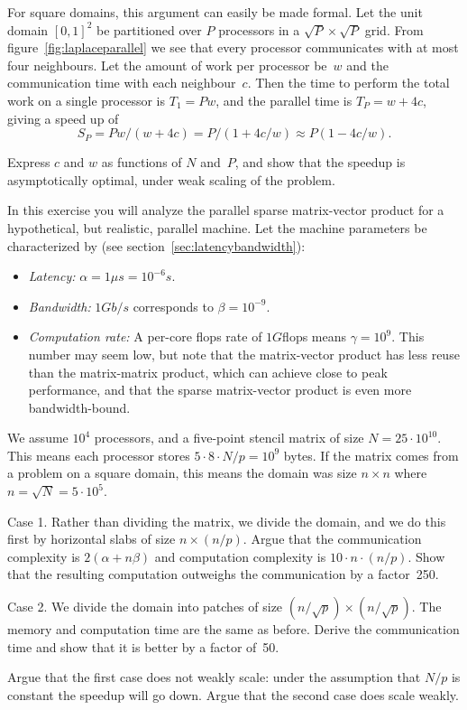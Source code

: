 For square domains, this argument can easily be made formal. Let the
unit domain $[0,1]^2$ be partitioned over $P$ processors in a $\sqrt
P\times \sqrt P$ grid. From figure~\ref{fig:laplaceparallel} we see
that every processor communicates with at most four neighbours. Let
the amount of work per processor be~$w$ and the communication time
with each neighbour~$c$. Then the time to perform the total work on a
single processor is $T_1=Pw$, and the parallel time is $T_P=w+4c$,
giving a speed up of
\[ S_P=Pw/(w+4c)=P/(1+4c/w)\approx P(1-4c/w). \]

\begin{exercise}
  Express $c$ and $w$ as functions of $N$ and~$P$, and show that the
  speedup is asymptotically optimal, under weak scaling of the problem.
\end{exercise}

\begin{exercise}
  In this exercise you will analyze the parallel sparse matrix-vector
  product for a hypothetical, but realistic, parallel machine.
  Let the machine parameters be characterized by (see
  section~\ref{sec:latencybandwidth}):
  \begin{itemize}
  \item {\it Latency:} $\alpha=1\mu s=10^{-6}s$.
  \item {\it Bandwidth:} $1Gb/s$ corresponds to $\beta=10^{-9}$.
  \item {\it Computation rate:} A per-core flops rate of $1G$flops
    means $\gamma=10^9$. This number may seem low, but note that the
    matrix-vector product has less reuse than the matrix-matrix
    product, which can achieve close to peak performance,
    and that the sparse matrix-vector product is even more
    bandwidth-bound.
  \end{itemize}
  We assume $10^4$ processors, and a five-point
  stencil matrix of size $N=25\cdot 10^{10}$. This means each
  processor stores $5\cdot 8\cdot N/p=10^9$ bytes. If the matrix comes
  from a problem on a square domain, this means the domain was size
  $n\times n$ where $n=\sqrt N=5\cdot 10^5$.

  Case 1. Rather than dividing the matrix, we divide the domain, and
  we do this first by horizontal slabs of size $n\times (n/p)$. Argue
  that the communication complexity is $2(\alpha+n\beta)$ and
  computation complexity is $10\cdot n\cdot (n/p)$. Show that the
  resulting computation outweighs the communication by a factor~250.

  Case 2. We divide the domain into patches of size $(n/\sqrt p)\times
  (n/\sqrt p)$. The memory and computation time are the same as
  before. Derive the communication time and show that it is better by
  a factor of~50. 

  Argue that the first case does not weakly scale: under the
  assumption that $N/p$ is constant the speedup will go down. 
  Argue that the second case does scale weakly.
\end{exercise}

